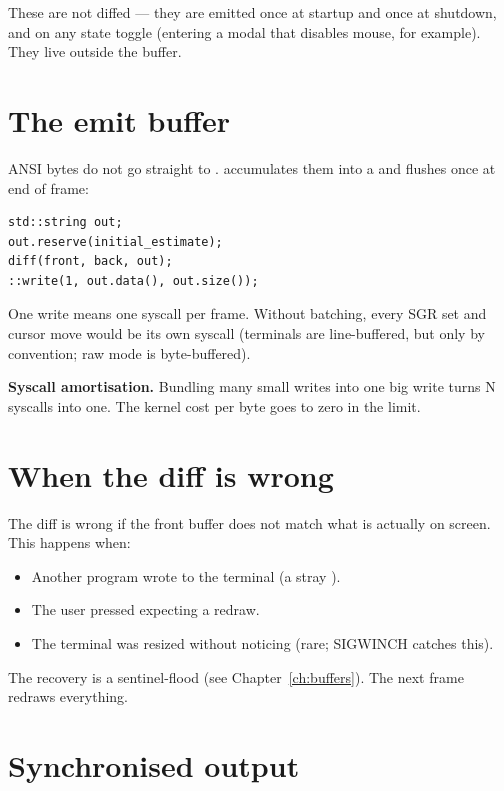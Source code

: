 These are not diffed --- they are emitted once at startup and
once at shutdown, and on any state toggle (entering a modal that
disables mouse, for example). They live outside the buffer.

\section{The emit buffer}

ANSI bytes do not go straight to . \maya{}
accumulates them into a  and flushes once at
end of frame:

\begin{lstlisting}
std::string out;
out.reserve(initial_estimate);
diff(front, back, out);
::write(1, out.data(), out.size());
\end{lstlisting}

One write means one syscall per frame. Without batching, every
SGR set and cursor move would be its own syscall (terminals are
line-buffered, but only by convention; raw mode is byte-buffered).

\begin{idea}
\textbf{Syscall amortisation.} Bundling many small writes into
one big write turns N syscalls into one. The kernel cost per
byte goes to zero in the limit.
\end{idea}

\section{When the diff is wrong}

The diff is wrong if the front buffer does not match what is
actually on screen. This happens when:

\begin{itemize}[leftmargin=*]
  \item Another program wrote to the terminal (a stray
    ).
  \item The user pressed  expecting a redraw.
  \item The terminal was resized without \maya{} noticing
    (rare; SIGWINCH catches this).
\end{itemize}

The recovery is a sentinel-flood (see Chapter~\ref{ch:buffers}). The
next frame redraws everything.

\section{Synchronised output}

